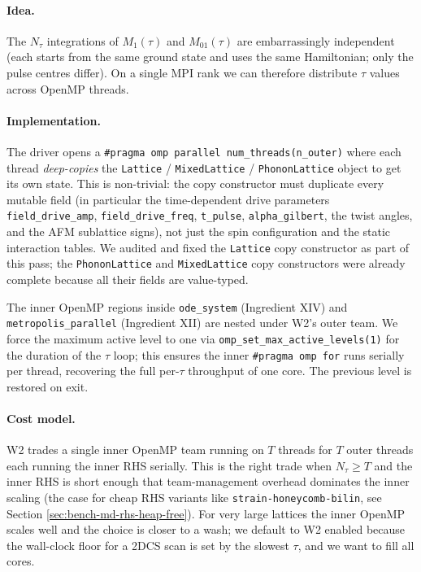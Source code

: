\documentclass[11pt,letterpaper]{article}
\begin{document}
\paragraph{Idea.}  The $N_\tau$ integrations of $M_1(\tau)$ and
$M_{01}(\tau)$ are embarrassingly independent (each starts from the
same ground state and uses the same Hamiltonian; only the pulse
centres differ).  On a single MPI rank we can therefore distribute
$\tau$ values across OpenMP threads.

\paragraph{Implementation.}  The driver opens a
\texttt{\#pragma omp parallel num\_threads(n\_outer)} where each
thread \emph{deep-copies} the \texttt{Lattice} /
\texttt{MixedLattice} / \texttt{PhononLattice} object to get its
own state.  This is non-trivial: the copy constructor must
duplicate every mutable field (in particular the time-dependent
drive parameters \texttt{field\_drive\_amp},
\texttt{field\_drive\_freq}, \texttt{t\_pulse},
\texttt{alpha\_gilbert}, the twist angles, and the AFM sublattice
signs), not just the spin configuration and the static interaction
tables.  We audited and fixed the \texttt{Lattice} copy
constructor as part of this pass; the \texttt{PhononLattice} and
\texttt{MixedLattice} copy constructors were already complete
because all their fields are value-typed.

The inner OpenMP regions inside \texttt{ode\_system} (Ingredient
XIV) and \texttt{metropolis\_parallel} (Ingredient XII) are nested
under W2's outer team.  We force the maximum active level to one
via \texttt{omp\_set\_max\_active\_levels(1)} for the duration of
the $\tau$ loop; this ensures the inner \texttt{\#pragma omp for}
runs serially per thread, recovering the full per-$\tau$ throughput
of one core.  The previous level is restored on exit.

\paragraph{Cost model.}  W2 trades a single inner OpenMP team
running on $T$ threads for $T$ outer threads each running the inner
RHS serially.  This is the right trade when $N_\tau \geq T$ and the
inner RHS is short enough that team-management overhead dominates
the inner scaling (the case for cheap RHS variants like
\texttt{strain-honeycomb-bilin}, see Section
\ref{sec:bench-md-rhs-heap-free}).  For very large lattices the
inner OpenMP scales well and the choice is closer to a wash; we
default to W2 enabled because the wall-clock floor for a 2DCS
scan is set by the slowest $\tau$, and we want to fill all cores.
\end{document}
